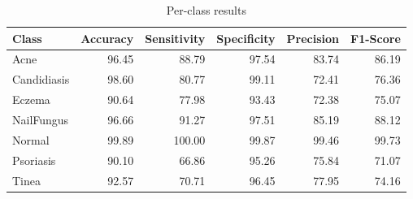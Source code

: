 \begin{table}
\caption{Per-class results}
\label{tab:results}
\begin{tabular}{lrrrrr}
\toprule
Class & Accuracy & Sensitivity & Specificity & Precision & F1-Score \\
\midrule
Acne & 96.45 & 88.79 & 97.54 & 83.74 & 86.19 \\
Candidiasis & 98.60 & 80.77 & 99.11 & 72.41 & 76.36 \\
Eczema & 90.64 & 77.98 & 93.43 & 72.38 & 75.07 \\
NailFungus & 96.66 & 91.27 & 97.51 & 85.19 & 88.12 \\
Normal & 99.89 & 100.00 & 99.87 & 99.46 & 99.73 \\
Psoriasis & 90.10 & 66.86 & 95.26 & 75.84 & 71.07 \\
Tinea & 92.57 & 70.71 & 96.45 & 77.95 & 74.16 \\
\bottomrule
\end{tabular}
\end{table}
